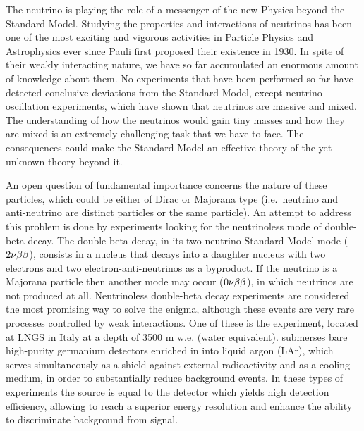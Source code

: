 	The neutrino is playing the role of a messenger of the new Physics beyond the Standard Model. Studying the properties and interactions of neutrinos has been one of the most exciting and vigorous activities in Particle Physics and Astrophysics ever since Pauli first proposed their existence in 1930. In spite of their weakly interacting nature, we have so far accumulated an enormous amount of knowledge about them. No experiments that have been performed so far have detected conclusive deviations from the Standard Model, except neutrino oscillation experiments, which have shown that neutrinos are massive and mixed. The understanding of how the neutrinos would gain tiny masses and how they are mixed is an extremely challenging task that we have to face. The consequences could make the Standard Model an effective theory of the yet unknown theory beyond it.

	An open question of fundamental importance concerns the nature of these particles, which could be either of Dirac or Majorana type (i.e.~neutrino and anti-neutrino are distinct particles or the same particle). An attempt to address this problem is done by experiments looking for the neutrinoless mode of double-beta decay. The double-beta decay, in its two-neutrino Standard Model mode ($2\nu\beta\beta$), consists in a nucleus that decays into a daughter nucleus with two electrons and two electron-anti-neutrinos as a byproduct. If the neutrino is a Majorana particle then another mode may occur ($0\nu\beta\beta$), in which neutrinos are not produced at all. Neutrinoless double-beta decay experiments are considered the most promising way to solve the enigma, although these events are very rare processes controlled by weak interactions. One of these is the {\gerda} experiment, located at LNGS in Italy at a depth of 3500 m w.e. (water equivalent). {\gerda} submerses bare high-purity germanium detectors enriched in  into liquid argon (LAr), which serves simultaneously as a shield against external radioactivity and as a cooling medium, in order to substantially reduce background events. In these types of experiments the source is equal to the detector which yields high detection efficiency, allowing to reach a superior energy resolution and enhance the ability to discriminate background from signal.

